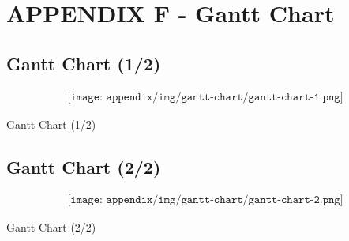 \section{APPENDIX F - Gantt Chart} \label{sec:appF}
\subsection{Gantt Chart (1/2)}
\begin{Figure}
    \begin{align*}
        \texttt{[image: appendix/img/gantt-chart/gantt-chart-1.png]}
    \end{align*}
    \caption{Gantt Chart (1/2)}
    \label{fig:gantt-chart-1}
\end{Figure}

\subsection{Gantt Chart (2/2)}

\begin{Figure}
    \begin{align*}
        \texttt{[image: appendix/img/gantt-chart/gantt-chart-2.png]}
    \end{align*}
    \caption{Gantt Chart (2/2)}
    \label{fig:gantt-chart-2}
\end{Figure}
